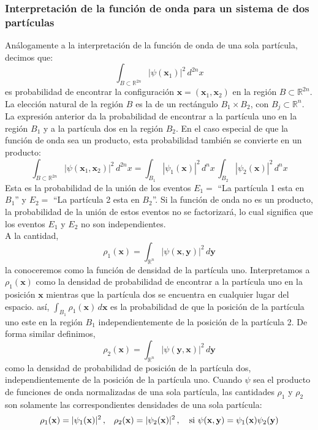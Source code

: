 \documentclass[12pt]{book}
\numberwithin{equation}{chapter}
\def\R{\mathbb{R}}
\def\x{\mathbf{x}}
\def\y{\mathbf{y}}
\begin{document}
\subsubsection{Interpretaci\'on de la funci\'on de onda para un sistema de dos part\'iculas }
An\'alogamente a la interpretaci\'on de la funci\'on de onda de una sola part\'icula, decimos que:
\begin{equation}
\int_{B \subset \R^{2n}} |\psi (\x_{1})|^{2} \, d^{2n}x
\end{equation}
es probabilidad de encontrar la configuraci\'on $\x= ( \x_{1} , \x_{2} )$ en la regi\'on $B \subset \R^{2n}$. La elecci\'on natural de la regi\'on $B$ es la de un rect\'angulo $ B_{1} \times B_{2} $, con $B_{j} \subset \R^{n}$. La expresi\'on anterior da la probabilidad de encontrar a la part\'icula uno en la regi\'on $B_{1}$ y a la part\'icula dos en la regi\'on $B_{2}$. En el caso especial de que la funci\'on de onda sea un producto, esta probabilidad tambi\'en se convierte en un producto:
\begin{equation}
\int_{B \subset \R^{2n}} |\psi( \x_{1},\x_{2} ) |^{2}\, d^{2n}x = \int_{B_{1}} | \psi_{1}(\x) |^{2} \, d^{n}x \, \int_{B_{2}} | \psi_{2}(\x) |^{2} \, d^{n}x
\end{equation}
Esta es la probabilidad de la uni\'on de los eventos $E_{1}=$ ``La part\'icula 1 esta en $B_{1}$'' y $E_{2}=$ ``La part\'icula 2 esta en $B_{2}$''. Si la funci\'on de onda no es un producto, la probabilidad de la uni\'on de estos eventos no se factorizar\'a, lo cual significa que los eventos $E_{1}$ y $E_{2}$ no son independientes.\\
A la cantidad,
\begin{equation}
\rho_{1}(\x)= \int_{\R^{n}} |\psi (\x,\y)|^{2} \, d\y
\end{equation}
la conoceremos como la funci\'on de densidad de la part\'icula uno. Interpretamos a $\rho_{1}(\x)$ como la densidad de probabilidad de encontrar a la part\'icula uno en la posici\'on $\x$ mientras que la part\'icula dos se encuentra en cualquier lugar del espacio. as\'i, $\int_{B_{1}} \rho_{1}(\x)\, d\x $ es la probabilidad de que la posici\'on de la part\'icula uno este en la regi\'on $B_{1}$ independientemente de la posici\'on de la part\'icula 2. De forma similar definimos,
\begin{equation}
\rho_{2}(\x)= \int_{\R^{n}} |\psi ( \y , \x ) |^{2}\, d\y
\end{equation}
como la densidad de probabilidad de posici\'on de la part\'icula dos, independientemente de la posici\'on de la part\'icula uno. Cuando $\psi$ sea el producto de funciones de onda normalizadas de una sola part\'icula, las cantidades $\rho_{1}$ y $\rho_{2}$ son solamente las correspondientes densidades de una sola part\'icula:
\begin{equation}
\rho_{1}(\x)=|\psi_{1}(\x)|^{2} \,,\,\,\,\,\, \rho_{2}(\x)=|\psi_{2}(\x)|^{2} \,,\,\,\,\, \hbox{ si } \psi(\x , \y )= \psi_{1}(\x) \psi_{2}(\y)  
\end{equation}
\end{document}
